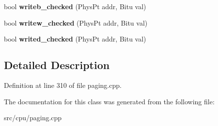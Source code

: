 \begin{DoxyCompactItemize}
\item 
\hypertarget{classPageFoilHandler_a6da0b95977688171ce76cdd7e1f9e92e}{bool {\bfseries writeb\-\_\-checked} (Phys\-Pt addr, Bitu val)}\label{classPageFoilHandler_a6da0b95977688171ce76cdd7e1f9e92e}

\item 
\hypertarget{classPageFoilHandler_a73568f447018da5957bad2ff90adbb5d}{bool {\bfseries writew\-\_\-checked} (Phys\-Pt addr, Bitu val)}\label{classPageFoilHandler_a73568f447018da5957bad2ff90adbb5d}

\item 
\hypertarget{classPageFoilHandler_ac8ea0331f5b106050c7d3ff801c4bdf3}{bool {\bfseries writed\-\_\-checked} (Phys\-Pt addr, Bitu val)}\label{classPageFoilHandler_ac8ea0331f5b106050c7d3ff801c4bdf3}

\end{DoxyCompactItemize}


\subsection{Detailed Description}


Definition at line 310 of file paging.\-cpp.



The documentation for this class was generated from the following file\-:\begin{DoxyCompactItemize}
\item 
src/cpu/paging.\-cpp\end{DoxyCompactItemize}
